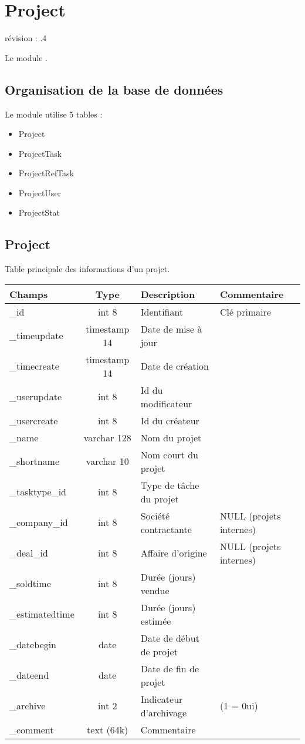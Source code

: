 

\clearpage
\section{Project}
révision : .4

Le module \project \obm.

\subsection{Organisation de la base de données}

Le module \project utilise 5 tables :
\begin{itemize}
 \item Project
 \item ProjectTask
 \item ProjectRefTask
 \item ProjectUser
 \item ProjectStat
\end{itemize}

\subsection{Project}
Table principale des informations d'un projet.\\

\begin{tabular}{|p{3cm}|c|p{5.4cm}|p{2.6cm}|}
\hline
\textbf{Champs} & \textbf{Type} & \textbf{Description} & \textbf{Commentaire} \\
\hline
\_id & int 8 & Identifiant & Clé primaire \\
\hline
\_timeupdate & timestamp 14 & Date de mise à jour & \\
\hline
\_timecreate & timestamp 14 & Date de création & \\
\hline
\_userupdate & int 8 & Id du modificateur & \\
\hline
\_usercreate & int 8 & Id du créateur & \\
\hline
\_name & varchar 128 & Nom du projet & \\
\hline
\_shortname & varchar 10 & Nom court du projet & \\
\hline
\_tasktype\_id & int 8 & Type de tâche du projet & \\
\hline
\_company\_id & int 8 & Société contractante & NULL (projets internes)\\
\hline
\_deal\_id & int 8 & Affaire d'origine & NULL (projets internes)\\
\hline
\_soldtime & int 8 & Durée (jours) vendue & \\
\hline
\_estimatedtime & int 8 & Durée (jours) estimée & \\
\hline
\_datebegin & date & Date de début de projet & \\
\hline
\_dateend & date & Date de fin de projet & \\
\hline
\_archive & int 2 & Indicateur d'archivage & (1 = 0ui)\\
\hline
\_comment & text (64k) & Commentaire &\\
\hline
\end{tabular}


